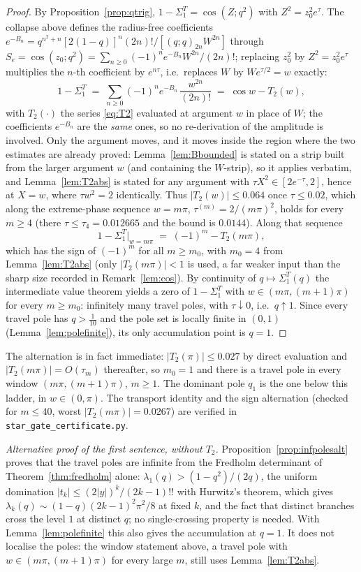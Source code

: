 \documentclass[11pt]{article}
\theoremstyle{plain}
\theoremstyle{definition}
\theoremstyle{remark}
\begin{document}
\begin{proof}
By Proposition~\ref{prop:qtrig}, $1-\Sigma_1^T=\cos(Z;q^2)$ with $Z^2=z_0^2e^{\tau}$. The collapse
above defines the radius-free coefficients $e^{-B_n}=q^{n^2+n}[2(1-q)]^n(2n)!/[(q;q)_{2n}W^{2n}]$
through $S_e=\cos(z_0;q^2)=\sum_{n\ge0}(-1)^ne^{-B_n}W^{2n}/(2n)!$; replacing $z_0^2$ by
$Z^2=z_0^2e^\tau$ multiplies the $n$-th coefficient by $e^{n\tau}$, i.e.\ replaces $W$ by
$We^{\tau/2}=w$ exactly:
\[
 1-\Sigma_1^T\;=\;\sum_{n\ge0}(-1)^n e^{-B_n}\,\frac{w^{2n}}{(2n)!}\;=\;\cos w-T_2(w),
\]
with $T_2(\cdot)$ the series \eqref{eq:T2} evaluated at argument $w$ in place of $W$; the
coefficients $e^{-B_n}$ are the \emph{same} ones, so no re-derivation of the amplitude is involved.
Only the argument moves, and it moves inside the region where the two estimates are already
proved: Lemma~\ref{lem:Bbounded} is stated on a strip built from the larger argument $w$ (and
containing the $W$-strip), so it applies verbatim, and Lemma~\ref{lem:T2abs} is stated for any
argument with $\tau X^2\in[2e^{-\tau},2]$, hence at $X=w$, where $\tau w^2=2$ identically. Thus
$|T_2(w)|\le0.064$ once $\tau\le0.02$, which along the extreme-phase sequence $w=m\pi$,
$\tau^{(m)}=2/(m\pi)^2$, holds for every $m\ge4$ (there $\tau\le\tau_4=0.012665$ and the bound is
$0.0144$). Along that sequence
\[
 1-\Sigma_1^T\big|_{w=m\pi}\;=\;(-1)^m-T_2(m\pi),
\]
which has the sign of $(-1)^m$ for all $m\ge m_0$, with $m_0=4$ from
Lemma~\ref{lem:T2abs} (only $|T_2(m\pi)|<1$ is used, a far weaker input than the sharp size
recorded in Remark~\ref{lem:cos}). By continuity of $q\mapsto\Sigma_1^T(q)$ the
intermediate value theorem yields a zero of $1-\Sigma_1^T$ with $w\in(m\pi,(m+1)\pi)$ for every
$m\ge m_0$: infinitely many travel poles, with $\tau\downarrow0$, i.e.\ $q\uparrow1$. Since every
travel pole has $q>\tfrac1{10}$ and the pole set is locally finite in $(0,1)$
(Lemma~\ref{lem:polefinite}), its only accumulation point is $q=1$.
\end{proof}

\noindent The alternation is in fact immediate: $|T_2(\pi)|\le0.027$ by direct evaluation and
$|T_2(m\pi)|=O(\tau_m)$ thereafter, so $m_0=1$ and there is a travel pole in every window
$(m\pi,(m+1)\pi)$, $m\ge1$. The dominant pole $q_1$ is the one below this ladder, in
$w\in(0,\pi)$. The transport identity and the sign alternation (checked for $m\le40$, worst
$|T_2(m\pi)|=0.0267$) are verified in \texttt{star\_gate\_certificate.py}.

\emph{Alternative proof of the first sentence, without $T_2$.} Proposition~\ref{prop:infpolesalt}
proves that the travel poles are infinite from the Fredholm determinant of
Theorem~\ref{thm:fredholm} alone: $\lambda_1(q)>(1-q^2)/(2q)$, the uniform domination
$|t_k|\le(2|y|)^k/(2k-1)!!$ with Hurwitz's theorem, which gives
$\lambda_k(q)\sim(1-q)(2k-1)^2\pi^2/8$ at fixed $k$, and the fact that distinct branches cross the
level $1$ at distinct $q$; no single-crossing property is needed. With Lemma~\ref{lem:polefinite}
this also gives the accumulation at $q=1$. It does not localise the poles: the window statement
above, a travel pole with $w\in(m\pi,(m+1)\pi)$ for every large $m$, still uses
Lemma~\ref{lem:T2abs}.
\end{document}
